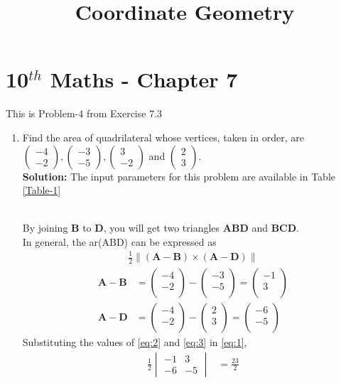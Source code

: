 \documentclass[12pt]{article}
\newcommand{\mydet}[1]{\ensuremath{\begin{vmatrix}#1\end{vmatrix}}}
\providecommand{\brak}[1]{\ensuremath{\left(#1\right)}}
\providecommand{\norm}[1]{\left\lVert#1\right\rVert}
\newcommand{\solution}{\noindent \textbf{Solution: }}
\newcommand{\myvec}[1]{\ensuremath{\begin{pmatrix}#1\end{pmatrix}}}
\let\vec\mathbf
\begin{document}
\begin{center}
\title{\textbf{Coordinate Geometry}}
\date{\vspace{-5ex}} %
\maketitle
\end{center}
\setcounter{page}{1}
\section*{10$^{th}$ Maths - Chapter 7}
This is Problem-4 from Exercise 7.3
\begin{enumerate}
\item Find the area of quadrilateral whose vertices, taken in order, are $\myvec{-4 \\ -2}, \myvec{-3\\-5}, \myvec{3\\-2}$ and $\myvec{2\\3}$.\\
\solution The input parameters for this problem are available in Table \eqref{Table-1}\\
\begin{table}[ht!]\centering

\caption{}
\label{Table-1} 
\end{table}
\\By joining $\vec{B}$ to $\vec{D}$, you will get two triangles $\vec{A}\vec{B}\vec{D}$ and $\vec{B}\vec{C}\vec{D}$.\\
		In general, the ar(ABD) can be expressed as
  \begin{align}
  \frac{1}{2} \norm{\brak{\vec{A}-\vec{B}}  \times 
   \brak{\vec{A}- \vec{D}}} \label{eq:1} 
\end{align}
\begin{align}
	\vec{A}- \vec{B} &= \myvec{-4\\-2\\}-\myvec{-3\\-5\\}=\myvec{-1\\3\\}\label{eq:2}\\
	  \vec{A}- \vec{D} &= \myvec{-4\\-2\\}-\myvec{2\\3\\}=\myvec{-6\\-5\\}\label{eq:3}
  \end{align}
Substituting the values of \eqref{eq:2} and \eqref{eq:3} in \eqref{eq:1},
\begin{align}
	\frac{1}{2}\mydet{-1 & 3\\-6 & -5}  
	&=	\frac{23}{2}
\end{align}


\end{enumerate}
\end{document}
